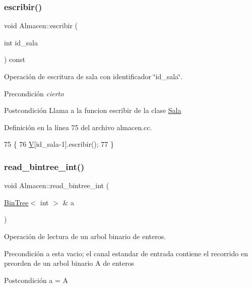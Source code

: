\subsubsection{\texorpdfstring{escribir()}{escribir()}}
{\footnotesize\ttfamily void Almacen\+::escribir (\begin{DoxyParamCaption}\item[{int}]{id\+\_\+sala }\end{DoxyParamCaption}) const}



Operación de escritura de sala con identificador \char`\"{}id\+\_\+sala\char`\"{}. 

\begin{DoxyPrecond}{Precondición}
{\itshape cierto} 
\end{DoxyPrecond}
\begin{DoxyPostcond}{Postcondición}
Llama a la funcion escribir de la clase \mbox{\hyperlink{class_sala}{Sala}} 
\end{DoxyPostcond}


Definición en la línea 75 del archivo almacen.\+cc.


\begin{DoxyCode}
75                                        \{
76   \mbox{\hyperlink{class_almacen_a76cad3a8f2f670e26d7ceb827f7f9e69}{V}}[id\_sala-1].escribir();
77 \}
\end{DoxyCode}
\mbox{\label{class_almacen_afd1437f2b2157c3eb63321c467d4a8f2}} 
\subsubsection{\texorpdfstring{read\+\_\+bintree\+\_\+int()}{read\_bintree\_int()}}
{\footnotesize\ttfamily void Almacen\+::read\+\_\+bintree\+\_\+int (\begin{DoxyParamCaption}\item[{\mbox{\hyperlink{class_bin_tree}{Bin\+Tree}}$<$ int $>$ \&}]{a }\end{DoxyParamCaption})}



Operación de lectura de un arbol binario de enteros. 

\begin{DoxyPrecond}{Precondición}
a esta vacio; el canal estandar de entrada contiene el recorrido en preorden de un arbol binario A de enteros 
\end{DoxyPrecond}
\begin{DoxyPostcond}{Postcondición}
a = A 
\end{DoxyPostcond}


